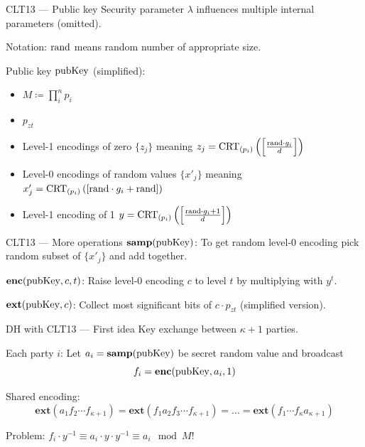 \documentclass[english]{beamer}
\begin{document}
    \begin{frame}{CLT13 --- Public key}
        Security parameter $\lambda$ influences multiple internal parameters (omitted).

        Notation: $\mathrm{rand}$ means random number of appropriate size.

        Public key $\mathrm{pubKey}$ (simplified):
        \begin{itemize}
            \item $M \coloneqq \prod_i^n p_i$
            \item $p_{zt}$
            \item Level-1 encodings of zero $\{z_j\}$ meaning $z_j = \operatorname{CRT}_{(p_{i})}\left(\left[\frac{\mathrm{rand} \cdot g_i}{d}\right]\right)$
            \item Level-0 encodings of random values $\{x'_j\}$ meaning $x'_j = \operatorname{CRT}_{(p_{i})}\left(\left[\mathrm{rand} \cdot g_i + \mathrm{rand}\right]\right)$
            \item Level-1 encoding of 1 $y = \operatorname{CRT}_{(p_{i})}\left(\left[\frac{\mathrm{rand} \cdot g_i + 1}{d}\right]\right)$
        \end{itemize}
    \end{frame}
    \begin{frame}{CLT13 --- More operations}
        $\mathbf{samp}(\mathrm{pubKey})$: To get random level-0 encoding pick random subset of $\{x'_j\}$ and add together.
        \pause

        $\mathbf{enc}(\mathrm{pubKey}, c, t)$: Raise level-0 encoding $c$ to level $t$ by multiplying with $y^t$.
        \pause

        $\mathbf{ext}(\mathrm{pubKey}, c)$: Collect most significant bits of $c \cdot p_{zt}$ (simplified version).
    \end{frame}
    \begin{frame}{DH with CLT13 --- First idea}
        Key exchange between $\kappa + 1$ parties.

        Each party $i$: Let $a_i = \mathbf{samp}(\mathrm{pubKey})$ be secret random value and broadcast
        \begin{equation*}
            f_i = \mathbf{enc}(\mathrm{pubKey}, a_i, 1)
        \end{equation*}

        Shared encoding:
        \begin{equation*}
            \mathbf{ext}(a_1 f_2 \cdots f_{\kappa+1}) = \mathbf{ext}(f_1 a_2 f_3 \cdots f_{\kappa+1}) = \dots = \mathbf{ext}(f_1 \cdots f_{\kappa} a_{\kappa + 1})
        \end{equation*}
        \pause

        Problem: $f_i \cdot y^{-1} \equiv a_i \cdot y \cdot y^{-1} \equiv a_i \mod M$!
    \end{frame}
\end{document}
